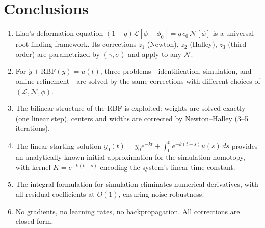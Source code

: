 \documentclass[11pt,a4paper]{article}
\begin{document}
\section{Conclusions}
\label{sec:conclusions}

\begin{enumerate}[nosep]
\item Liao's deformation equation $(1-q)\mathcal{L}[\phi - \phi_0] = q\,c_0\,\mathcal{N}[\phi]$ is a universal root-finding framework. Its corrections $z_1$ (Newton), $z_2$ (Halley), $z_3$ (third order) are parametrized by $(\gamma, \sigma)$ and apply to any $\mathcal{N}$.

\item For $\dot{y} + \text{RBF}(y) = u(t)$, three problems---identification, simulation, and online refinement---are solved by the same corrections with different choices of $(\mathcal{L}, \mathcal{N}, \phi)$.

\item The bilinear structure of the RBF is exploited: weights are solved exactly (one linear step), centers and widths are corrected by Newton--Halley (3--5 iterations).

\item The linear starting solution $y_0(t) = y_0 e^{-kt} + \int_0^t e^{-k(t-s)}u(s)\,ds$ provides an analytically known initial approximation for the simulation homotopy, with kernel $K = e^{-k(t-s)}$ encoding the system's linear time constant.

\item The integral formulation for simulation eliminates numerical derivatives, with all residual coefficients at $O(1)$, ensuring noise robustness.

\item No gradients, no learning rates, no backpropagation. All corrections are closed-form.
\end{enumerate}
\end{document}
